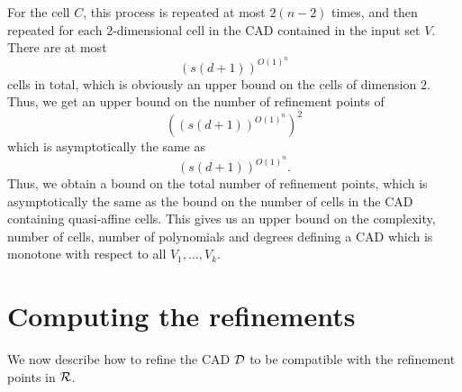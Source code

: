 \documentclass[
]{book}
\theoremstyle{definition}
\theoremstyle{definition}
\theoremstyle{definition}
\theoremstyle{definition}
\theoremstyle{remark}
\begin{document}
For the cell \(C\), this process is repeated at most \(2(n-2)\) times, and then repeated for each \(2\)-dimensional cell in the CAD contained in the input set \(V\).
There are at most
\[
(s(d+1))^{O(1)^{n}}
\]
cells in total, which is obviously an upper bound on the cells of dimension \(2\). Thus, we get an upper bound on the number of refinement points of
\[
\left((s(d+1))^{O(1)^{n}}\right)^2
\]
which is asymptotically the same as
\[
(s(d+1))^{O(1)^{n}}.
\]
Thus, we obtain a bound on the total number of refinement points, which is asymptotically the same as the bound on the number of cells in the CAD containing quasi-affine cells. This gives us an upper bound on the complexity, number of cells, number of polynomials and degrees defining a CAD which is monotone with respect to all \(V_1,\ldots,V_k\).

\hypertarget{sec:compute-refinement}{%
\section{Computing the refinements}\label{sec:compute-refinement}}

We now describe how to refine the CAD \(\cal D\) to be compatible with the refinement points in \(\cal R\).
\end{document}
